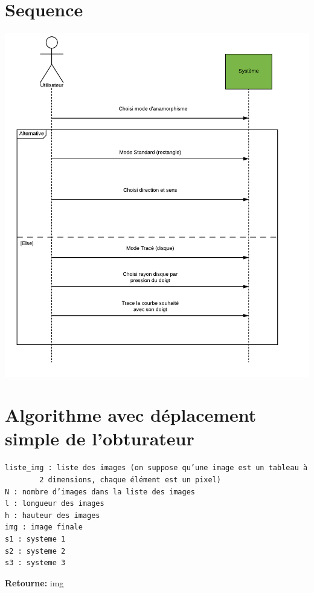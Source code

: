 \documentclass[a4paper,12pt]{report}
\begin{document}
\section{Sequence}
\begin{center}
 \includegraphics[scale=0.7]{./Sequence.png}
\end{center}
\newpage
\section{Algorithme avec déplacement simple de l'obturateur}
\begin{verbatim}
liste_img : liste des images (on suppose qu’une image est un tableau à 
	    2 dimensions, chaque élément est un pixel)
N : nombre d’images dans la liste des images
l : longueur des images
h : hauteur des images
img : image finale
s1 : systeme 1
s2 : systeme 2
s3 : systeme 3
\end{verbatim}

\noindent\textbf{Retourne:} img \bigskip
\end{document}
